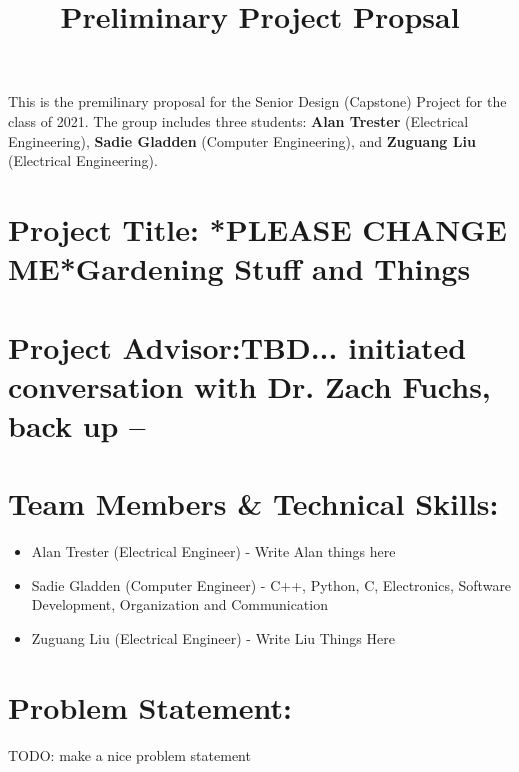 \documentclass[]{article}
\title{Preliminary Project Propsal}
\begin{document}
\maketitle

This is the premilinary proposal for the Senior Design (Capstone) Project for the class of 2021. The group includes three students: \textbf{Alan Trester} (Electrical Engineering), \textbf{Sadie Gladden} (Computer Engineering), and \textbf{Zuguang Liu} (Electrical Engineering).


\section*{Project Title: *PLEASE CHANGE ME*Gardening Stuff and Things}
	
	
\section*{Project Advisor:TBD... initiated conversation with Dr. Zach Fuchs, back up --}

\section*{Team Members \& Technical Skills:}
\begin{itemize}
	\item Alan Trester (Electrical Engineer) - Write Alan things here
	\item Sadie Gladden (Computer Engineer) - C++, Python, C, Electronics, Software Development, Organization and Communication 
	\item Zuguang Liu (Electrical Engineer) - Write Liu Things Here

\end{itemize}

\section*{Problem Statement:}
	TODO: make a nice problem statement
	
\end{document}
